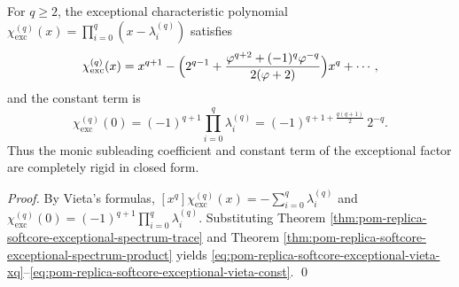 \begin{theorem}\label{thm:pom-replica-softcore-exceptional-vieta-endpoints}
For \(q\ge 2\), the exceptional characteristic polynomial
\(
\chi_{\mathrm{exc}}^{(q)}(x)=\prod_{i=0}^{q}(x-\lambda_i^{(q)})
\)
satisfies
\begin{equation}\label{eq:pom-replica-softcore-exceptional-vieta-xq}
\chi_{\mathrm{exc}}^{(q)}(x)
=x^{q+1}
-\Bigl(2^{q-1}+\frac{\varphi^{q+2}+(-1)^q\varphi^{-q}}{2(\varphi+2)}\Bigr)x^{q}
+\cdots,
\end{equation}
and the constant term is
\begin{equation}\label{eq:pom-replica-softcore-exceptional-vieta-const}
\chi_{\mathrm{exc}}^{(q)}(0)
=(-1)^{q+1}\prod_{i=0}^{q}\lambda_i^{(q)}
=(-1)^{q+1+\frac{q(q+1)}{2}}\,2^{-q}.
\end{equation}
Thus the monic subleading coefficient and constant term of the exceptional factor are completely rigid in closed form.
\end{theorem}
\begin{proof}
By Vieta's formulas,
\(
[x^{q}]\chi_{\mathrm{exc}}^{(q)}(x)=-\sum_{i=0}^{q}\lambda_i^{(q)}
\)
and
\(
\chi_{\mathrm{exc}}^{(q)}(0)=(-1)^{q+1}\prod_{i=0}^{q}\lambda_i^{(q)}
\).
Substituting Theorem \ref{thm:pom-replica-softcore-exceptional-spectrum-trace} and
Theorem \ref{thm:pom-replica-softcore-exceptional-spectrum-product}
yields \eqref{eq:pom-replica-softcore-exceptional-vieta-xq}--\eqref{eq:pom-replica-softcore-exceptional-vieta-const}. \qed
\end{proof}

